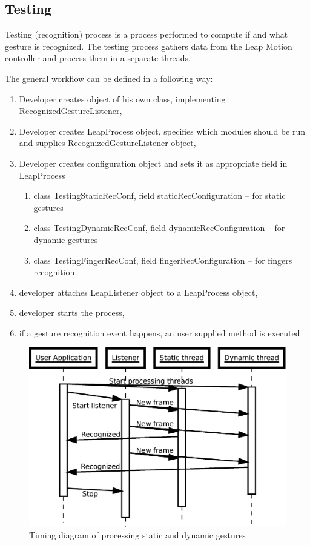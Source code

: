 \subsection{Testing}

Testing (recognition) process is a process performed to compute if and what gesture is recognized. 
The testing process gathers data from the Leap Motion controller and process them in a separate threads.

The general workflow can be defined in a following way:
\begin{enumerate}
  \item Developer creates object of his own class, implementing RecognizedGestureListener,
  \item Developer creates LeapProcess object, specifies which modules should be run and supplies RecognizedGestureListener object,
  \item Developer creates configuration object and sets it as appropriate field in LeapProcess
  \begin{enumerate}
  	\item class TestingStaticRecConf, field staticRecConfiguration -- for static gestures
  	\item class TestingDynamicRecConf, field dynamicRecConfiguration -- for dynamic gestures
  	\item class TestingFingerRecConf, field fingerRecConfiguration -- for fingers recognition
  \end{enumerate}
  \item developer attaches LeapListener object to a LeapProcess object,
  \item developer starts the process,
  \item if a gesture recognition event happens, an user supplied method is executed
\end{enumerate}

\begin{figure}[htb]
\centering
 \includegraphics[width=0.8\columnwidth]{figures/timeline.eps}
 \caption[]{Timing diagram of processing static and dynamic gestures}
 \label{processingtimeline}
\end{figure}

